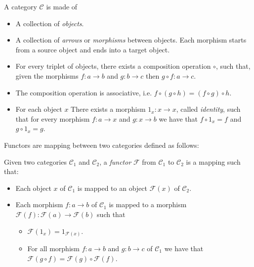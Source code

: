 \begin{definition}
	A category $\mathcal{C}$ is made of
	
	\begin{itemize}[noitemsep]
		\item A collection of \textit{objects}.
		\item A collection of \textit{arrows} or \textit{morphisms} between objects. Each morphism starts from a source object and ends into a target object.
		\item For every triplet of objects, there exists a composition operation $\circ$, such that, given the morphisms $f:a \rightarrow b$ and $g:b \rightarrow c$ then $g \circ f: a \rightarrow c$.
		\item The composition operation is associative, i.e. $f \circ (g \circ h) = (f \circ g) \circ h$.
		\item For each object $x$ There exists a morphism $1_x: x \rightarrow x$, called \textit{identity}, such that for every morphism $f:a \rightarrow x$ and $g: x \rightarrow b$ we have that $f \circ 1_x = f$ and $g \circ 1_x = g$.
	\end{itemize}
\end{definition}

\noindent
Functors are mapping between two categories defined as follows:

\begin{definition}
	Given two categories $\mathcal{C}_1$ and $\mathcal{C}_2$, a \textit{functor} $\mathcal{F}$ from $\mathcal{C}_1$ to $\mathcal{C}_2$ is a mapping such that:
	
	\begin{itemize}
		\item Each object $x$ of $\mathcal{C}_1$ is mapped to an object $\mathcal{F}(x)$ of $\mathcal{C}_2$.
		\item Each morphism $f: a \rightarrow b$ of $\mathcal{C}_1$ is mapped to a morphism $\mathcal{F}(f): \mathcal{F}(a) \rightarrow \mathcal{F}(b)$ such that
		\begin{itemize}
			\item $\mathcal{F}(1_x) = 1_{\mathcal{F}(x)}$.
			\item For all morphism $f: a \rightarrow b$ and $g: b \rightarrow c$ of $\mathcal{C}_1$ we have that $\mathcal{F}(g \circ f) = \mathcal{F}(g) \circ \mathcal{F}(f)$.
		\end{itemize}
	\end{itemize}
\end{definition}

